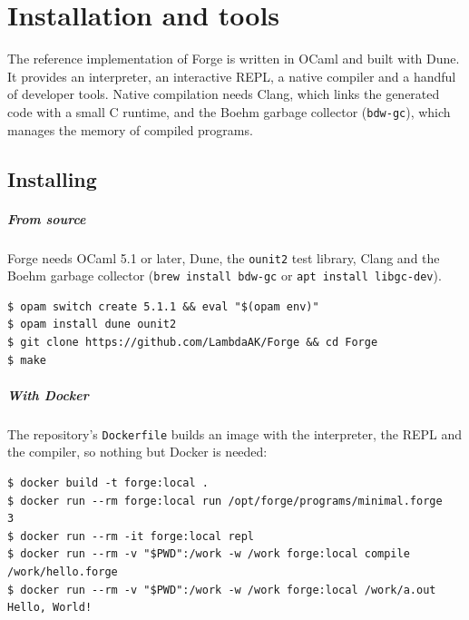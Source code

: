 \chapter{Installation and tools}
\label{ch:tools}

The reference implementation of Forge is written in OCaml and built with
Dune. It provides an interpreter, an interactive REPL, a native compiler and a
handful of developer tools. Native compilation needs Clang, which links the
generated code with a small C runtime, and the Boehm garbage collector
(\texttt{bdw-gc}), which manages the memory of compiled programs.

\section{Installing}

\paragraph{From source} Forge needs OCaml 5.1 or later, Dune, the
\texttt{ounit2} test library, Clang and the Boehm garbage collector
(\texttt{brew install bdw-gc} or \texttt{apt install libgc-dev}).

\begin{shellpanel}
\begin{lstlisting}
$ opam switch create 5.1.1 && eval "$(opam env)"
$ opam install dune ounit2
$ git clone https://github.com/LambdaAK/Forge && cd Forge
$ make
\end{lstlisting}
\end{shellpanel}

\paragraph{With Docker} The repository's \texttt{Dockerfile} builds an
image with the interpreter, the REPL and the compiler, so nothing but Docker
is needed:

\begin{shellpanel}
\begin{lstlisting}
$ docker build -t forge:local .
$ docker run --rm forge:local run /opt/forge/programs/minimal.forge
3
$ docker run --rm -it forge:local repl
$ docker run --rm -v "$PWD":/work -w /work forge:local compile /work/hello.forge
$ docker run --rm -v "$PWD":/work -w /work forge:local /work/a.out
Hello, World!
\end{lstlisting}
\end{shellpanel}


